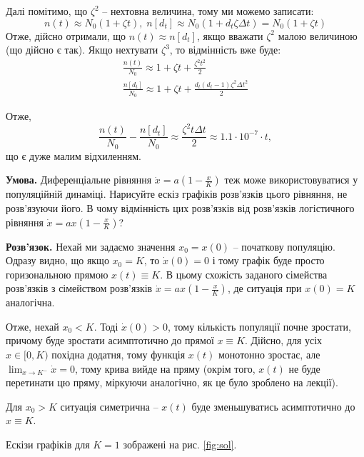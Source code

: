 \documentclass[oneside,solution]{tmpl}
\begin{document}
Далі помітимо, що $\zeta^2$ -- нехтовна величина, тому ми можемо записати:
\begin{equation}
    n(t) \approx N_0(1 + \zeta t), \; n[d_t] \approx N_0(1 + d_t\zeta \Delta t)=N_0(1+\zeta t)
\end{equation}
Отже, дійсно отримали, що $n(t) \approx n[d_t]$, якщо вважати $\zeta^2$ малою величиною (що дійсно є так). Якщо нехтувати $\zeta^3$, то відмінність вже буде:
\begin{gather}
    \frac{n(t)}{N_0} \approx 1 + \zeta t + \frac{\zeta^2 t^2}{2} \\
    \frac{n[d_t]}{N_0} \approx 1 + \zeta t + \frac{d_t(d_t-1)\zeta^2\Delta t^2}{2}
\end{gather}

Отже,
\begin{equation}
    \frac{n(t)}{N_0} - \frac{n[d_t]}{N_0} \approx \frac{\zeta^2t\Delta t}{2} \approx 1.1 \cdot 10^{-7}\cdot t,
\end{equation}
що є дуже малим відхиленням.


\textbf{Умова.} Диференціальне рівняння $\dot{x}=a\left(1-\frac{x}{K}\right)$ теж може використовуватися у популяційній динаміці. Нарисуйте ескіз графіків розв'язків цього рівняння, не розв'язуючи його. В чому відмінність цих розв'язків від розв'язків логістичного рівняння $\dot{x}=ax\left(1-\frac{x}{K}\right)$?

\textbf{Розв'язок.} Нехай ми задаємо значення $x_0=x(0)$ -- початкову популяцію. Одразу видно, що якщо $x_0=K$, то $\dot{x}(0)=0$ і тому графік буде просто горизональною прямою $x(t) \equiv K$. В цьому схожість заданого сімейства розв'язків з сімейством розв'язків $\dot{x}=ax\left(1-\frac{x}{K}\right)$, де ситуація при $x(0)=K$ аналогічна. 

Отже, нехай $x_0<K$. Тоді $\dot{x}(0) > 0$, тому кількість популяції почне зростати, причому буде зростати асимптотично до прямої $x \equiv K$. Дійсно, для усіх $x \in [0,K)$ похідна додатня, тому функція $x(t)$ монотонно зростає, але $\lim_{x \to K^-}\dot{x} = 0$, тому крива вийде на пряму (окрім того, $x(t)$ не буде перетинати цю пряму, міркуючи аналогічно, як це було зроблено на лекції). 

Для $x_0>K$ ситуація симетрична -- $x(t)$ буде зменьшуватись асимптотично до $x \equiv K$. 

Ескізи графіків для $K=1$ зображені на рис. \ref{fig:sol}.
\end{document}
